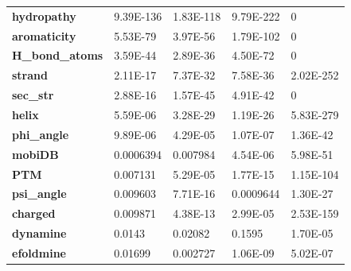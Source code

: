 \begin{table}[]
\begin{tabular}{lllll}
\textbf{hydropathy}           & 9.39E-136                      & 1.83E-118                       & 9.79E-222                      & 0                               \\
\textbf{aromaticity}          & 5.53E-79                       & 3.97E-56                        & 1.79E-102                      & 0                               \\
\textbf{H\_bond\_atoms}       & 3.59E-44                       & 2.89E-36                        & 4.50E-72                       & 0                               \\
\textbf{strand}               & 2.11E-17                       & 7.37E-32                        & 7.58E-36                       & 2.02E-252                       \\
\textbf{sec\_str}             & 2.88E-16                       & 1.57E-45                        & 4.91E-42                       & 0                               \\
\textbf{helix}                & 5.59E-06                       & 3.28E-29                        & 1.19E-26                       & 5.83E-279                       \\
\textbf{phi\_angle}           & 9.89E-06                       & 4.29E-05                        & 1.07E-07                       & 1.36E-42                        \\
\textbf{mobiDB}               & 0.0006394                      & 0.007984                        & 4.54E-06                       & 5.98E-51                        \\
\textbf{PTM}                  & 0.007131                       & 5.29E-05                        & 1.77E-15                       & 1.15E-104                       \\
\textbf{psi\_angle}           & 0.009603                       & 7.71E-16                        & 0.0009644                      & 1.30E-27                        \\
\textbf{charged}              & 0.009871                       & 4.38E-13                        & 2.99E-05                       & 2.53E-159                       \\
\textbf{dynamine}             & 0.0143                         & 0.02082                         & \cellcolor[HTML]{F54D4D}0.1595 & 1.70E-05                        \\
\textbf{efoldmine}            & 0.01699                        & 0.002727                        & 1.06E-09                       & 5.02E-07                        \\

\end{tabular}
\end{table}
